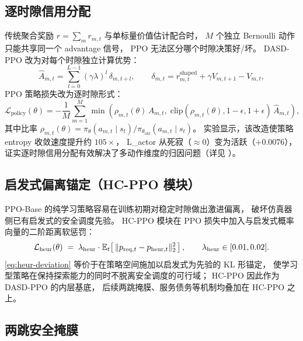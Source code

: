\subsection{逐时隙信用分配}
\label{subsec:credit}

传统聚合奖励 \(r=\sum_m r_{m,t}\) 与单标量价值估计配合时，
\(M\) 个独立 Bernoulli 动作只能共享同一个 advantage 信号，
PPO 无法区分哪个时隙决策好/坏。
DASD-PPO 改为对每个时隙独立计算优势：
\begin{equation}
\hat A_{m,t} = \sum_{l=0}^{L-1}(\gamma\lambda)^{l}\,\delta_{m,t+l},
\qquad
\delta_{m,t} = r^{\mathrm{shaped}}_{m,t} + \gamma V_{m,t+1} - V_{m,t},
\label{eq:gae-slot}
\end{equation}
PPO 策略损失改为逐时隙形式：
\begin{equation}
\mathcal{L}_{\mathrm{policy}}(\theta) =
- \frac{1}{M}\sum_{m=1}^{M}
\min\!\left(
\rho_{m,t}(\theta)\,\hat A_{m,t},\;
\mathrm{clip}(\rho_{m,t}(\theta),1-\epsilon,1+\epsilon)\,\hat A_{m,t}
\right),
\label{eq:ppo-slot}
\end{equation}
其中比率 \(\rho_{m,t}(\theta)=\pi_\theta(a_{m,t}\mid s_t)/\pi_{\theta_{\mathrm{old}}}(a_{m,t}\mid s_t)\)。
实验显示，该改造使策略 entropy 收敛速度提升约 \(105\times\)，
L\_actor 从死寂（\(\approx 0\)）变为活跃（\(+0.0076\)），
证实逐时隙信用分配有效解决了多动作维度的归因问题（详见 ）。

\subsection{启发式偏离锚定（HC-PPO 模块）}
\label{subsec:hc}

PPO-Base 的纯学习策略容易在训练初期对稳定时隙做出激进偏离，
破坏仿真器侧已有启发式的安全调度先验。
HC-PPO 模块在 PPO 损失中加入与启发式概率向量的二阶距离软惩罚：
\begin{equation}
\mathcal{L}_{\mathrm{heur}}(\theta) \;=\; \lambda_{\mathrm{heur}}\cdot
   \mathbb{E}_{t}\!\left[\,\lVert p_{\mathrm{req},t}-p_{\mathrm{heur},t}\rVert_2^{2}\,\right],
\qquad \lambda_{\mathrm{heur}}\in[0.01,0.02].
\label{eq:heur-deviation}
\end{equation}
\eqref{eq:heur-deviation} 等价于在策略空间施加以启发式为先验的 KL 形锚定，
使学习型策略在保持探索能力的同时不脱离安全调度的可行域；
HC-PPO 因此作为 DASD-PPO 的内层基底，
后续两跳掩膜、服务债务等机制均叠加在 HC-PPO 之上。

\subsection{两跳安全掩膜}
\label{subsec:mask}

